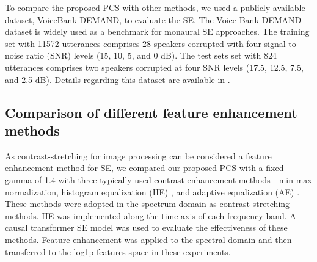 \documentclass[a4paper]{article}
\begin{document}
To compare the proposed PCS with other methods, we used a publicly available dataset, VoiceBank-DEMAND, to evaluate the SE. The Voice Bank-DEMAND dataset is widely used as a benchmark for monaural SE approaches. The training set with 11572 utterances comprises 28 speakers corrupted with four signal-to-noise ratio (SNR) levels (15, 10, 5, and 0 dB). The test sets set with 824 utterances comprises two speakers corrupted at four SNR levels (17.5, 12.5, 7.5, and 2.5 dB). Details regarding this dataset are available in \cite{valentini2017noisy}. 

\subsection {Comparison of different feature enhancement methods}
\label{ssec:comparison}

As contrast-stretching for image processing can be considered a feature enhancement method for SE, we compared our proposed PCS with a fixed gamma of 1.4 with three typically used contrast enhancement methods—min-max normalization, histogram equalization (HE) \cite{pizer1987adaptive}, and adaptive equalization (AE) \cite{qureshi1985adaptive}. These methods were adopted in the spectrum domain as contrast-stretching methods. HE was implemented along the time axis of each frequency band. A causal transformer SE model was used to evaluate the effectiveness of these methods. 
Feature enhancement was applied to the spectral domain and then transferred to the log1p features space in these experiments.
\end{document}

